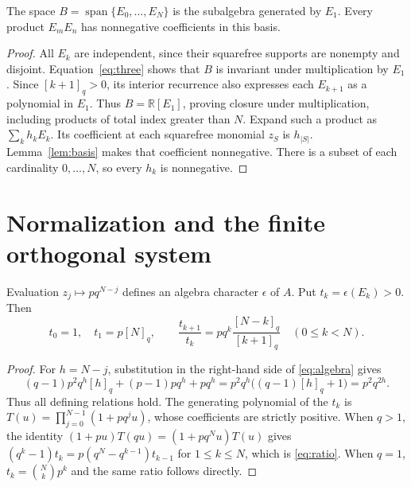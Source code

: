 \begin{proposition}\label{prop:subalgebra}
The space $B=\operatorname{span}\{E_0,\ldots,E_N\}$ is the subalgebra generated by $E_1$. Every product $E_mE_n$ has nonnegative coefficients in this basis.
\end{proposition}
\begin{proof}
All $E_k$ are independent, since their squarefree supports are nonempty and disjoint. Equation~\eqref{eq:three} shows that $B$ is invariant under multiplication by $E_1$. Since $[k+1]_q>0$, its interior recurrence also expresses each $E_{k+1}$ as a polynomial in $E_1$. Thus $B=\mathbb R[E_1]$, proving closure under multiplication, including products of total index greater than $N$.
Expand such a product as $\sum_k h_kE_k$. Its coefficient at each squarefree monomial $z_S$ is $h_{|S|}$. Lemma~\ref{lem:basis} makes that coefficient nonnegative. There is a subset of each cardinality $0,\ldots,N$, so every $h_k$ is nonnegative.
\end{proof}

\section{Normalization and the finite orthogonal system}\label{sec:normalization}
\begin{lemma}\label{lem:normalization}
Evaluation $z_j\mapsto pq^{N-j}$ defines an algebra character $\epsilon$ of $A$. Put $t_k=\epsilon(E_k)>0$. Then
\begin{equation}\label{eq:ratio}
t_0=1,\quad t_1=p[N]_q,\qquad
\frac{t_{k+1}}{t_k}=pq^k\frac{[N-k]_q}{[k+1]_q}\quad(0\leq k<N).
\end{equation}
\end{lemma}
\begin{proof}
For $h=N-j$, substitution in the right-hand side of \eqref{eq:algebra} gives
\[
(q-1)p^2q^h[h]_q+(p-1)pq^h+pq^h
=p^2q^h\big((q-1)[h]_q+1\big)=p^2q^{2h}.
\]
Thus all defining relations hold. The generating polynomial of the $t_k$ is
$T(u)=\prod_{j=0}^{N-1}(1+pq^ju)$, whose coefficients are strictly positive.
When $q>1$, the identity $(1+pu)T(qu)=(1+pq^Nu)T(u)$ gives
$(q^k-1)t_k=p(q^N-q^{k-1})t_{k-1}$ for $1\leq k\leq N$, which is \eqref{eq:ratio}. When $q=1$, $t_k=\binom Nk p^k$ and the same ratio follows directly.
\end{proof}

